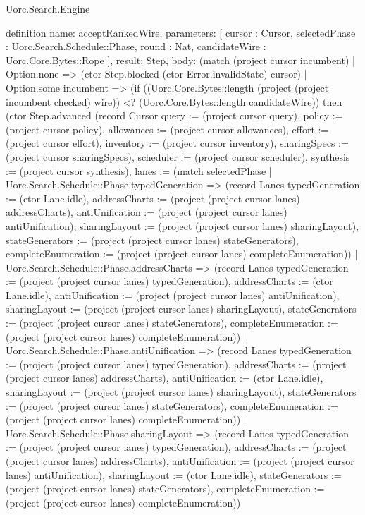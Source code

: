 \begin{lexlean}{Uorc.Search.Engine}
\begin{semanticmodule}
definition{
  name: acceptRankedWire,
  parameters: [
    cursor : Cursor,
    selectedPhase : Uorc.Search.Schedule::Phase,
    round : Nat,
    candidateWire : Uorc.Core.Bytes::Rope
  ],
  result: Step,
  body: (match (project cursor incumbent)
    | Option.none => (ctor Step.blocked (ctor Error.invalidState) cursor)
    | Option.some incumbent => (if ((Uorc.Core.Bytes::length (project (project incumbent checked) wire)) <? (Uorc.Core.Bytes::length candidateWire)) then (ctor Step.advanced (record Cursor {query := (project cursor query), policy := (project cursor policy), allowances := (project cursor allowances), effort := (project cursor effort), inventory := (project cursor inventory), sharingSpecs := (project cursor sharingSpecs), scheduler := (project cursor scheduler), synthesis := (project cursor synthesis), lanes := (match selectedPhase
      | Uorc.Search.Schedule::Phase.typedGeneration => (record Lanes {typedGeneration := (ctor Lane.idle), addressCharts := (project (project cursor lanes) addressCharts), antiUnification := (project (project cursor lanes) antiUnification), sharingLayout := (project (project cursor lanes) sharingLayout), stateGenerators := (project (project cursor lanes) stateGenerators), completeEnumeration := (project (project cursor lanes) completeEnumeration)})
      | Uorc.Search.Schedule::Phase.addressCharts => (record Lanes {typedGeneration := (project (project cursor lanes) typedGeneration), addressCharts := (ctor Lane.idle), antiUnification := (project (project cursor lanes) antiUnification), sharingLayout := (project (project cursor lanes) sharingLayout), stateGenerators := (project (project cursor lanes) stateGenerators), completeEnumeration := (project (project cursor lanes) completeEnumeration)})
      | Uorc.Search.Schedule::Phase.antiUnification => (record Lanes {typedGeneration := (project (project cursor lanes) typedGeneration), addressCharts := (project (project cursor lanes) addressCharts), antiUnification := (ctor Lane.idle), sharingLayout := (project (project cursor lanes) sharingLayout), stateGenerators := (project (project cursor lanes) stateGenerators), completeEnumeration := (project (project cursor lanes) completeEnumeration)})
      | Uorc.Search.Schedule::Phase.sharingLayout => (record Lanes {typedGeneration := (project (project cursor lanes) typedGeneration), addressCharts := (project (project cursor lanes) addressCharts), antiUnification := (project (project cursor lanes) antiUnification), sharingLayout := (ctor Lane.idle), stateGenerators := (project (project cursor lanes) stateGenerators), completeEnumeration := (project (project cursor lanes) completeEnumeration)})
}}
\end{semanticmodule}
\end{lexlean}
